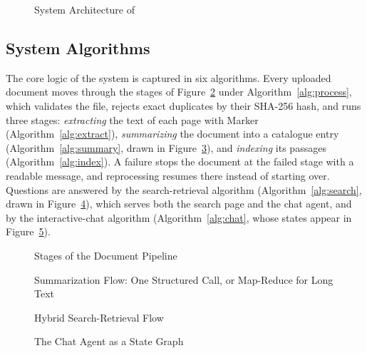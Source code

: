 \begin{figure}[htbp]
  \centering
  
  \caption{System Architecture of \cs{}}\label{fig:architecture}
\end{figure}

\subsection{System Algorithms}\label{sec:algorithms}

The core logic of the system is captured in six algorithms. Every uploaded document moves through the stages of Figure~\ref{fig:pipeline} under Algorithm~\ref{alg:process}, which validates the file, rejects exact duplicates by their SHA-256 hash, and runs three stages: \emph{extracting} the text of each page with Marker (Algorithm~\ref{alg:extract}), \emph{summarizing} the document into a catalogue entry (Algorithm~\ref{alg:summary}, drawn in Figure~\ref{fig:summarization}), and \emph{indexing} its passages (Algorithm~\ref{alg:index}). A failure stops the document at the failed stage with a readable message, and reprocessing resumes there instead of starting over. Questions are answered by the search-retrieval algorithm (Algorithm~\ref{alg:search}, drawn in Figure~\ref{fig:retrieval}), which serves both the search page and the chat agent, and by the interactive-chat algorithm (Algorithm~\ref{alg:chat}, whose states appear in Figure~\ref{fig:agent}).

\begin{figure}[htbp]
  \centering
  
  \caption{Stages of the Document Pipeline}\label{fig:pipeline}
\end{figure}



\begin{figure}[htbp]
  \centering
  
  \caption{Summarization Flow: One Structured Call, or Map-Reduce for Long Text}\label{fig:summarization}
\end{figure}

\begin{figure}[htbp]
  \centering
  
  \caption{Hybrid Search-Retrieval Flow}\label{fig:retrieval}
\end{figure}

\begin{figure}[htbp]
  \centering
  
  \caption{The Chat Agent as a State Graph}\label{fig:agent}
\end{figure}


